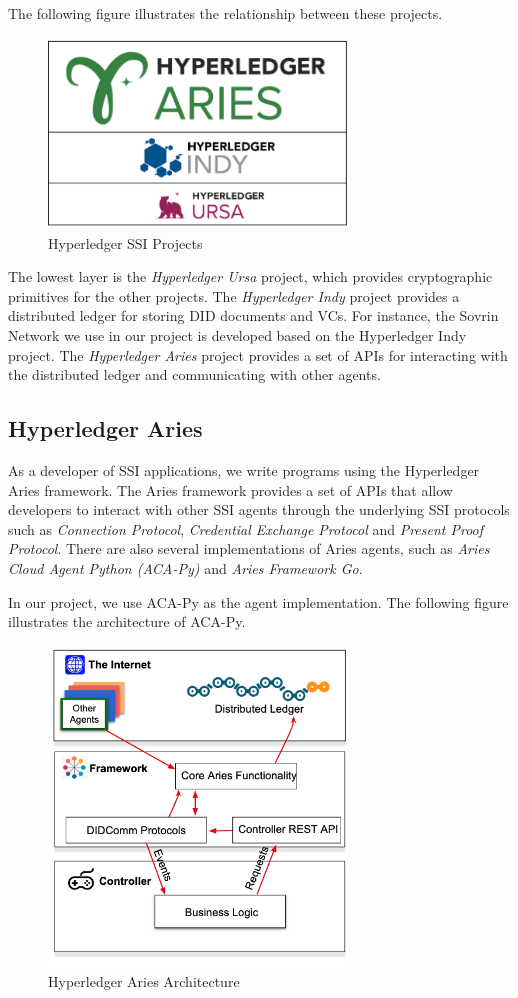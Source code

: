 \documentclass[
]{report}
\begin{document}
The following figure illustrates the relationship between these projects.

\begin{figure}
\centering
\includegraphics[width=8cm]{eco.png}
\caption{Hyperledger SSI Projects}
\end{figure}

The lowest layer is the \emph{Hyperledger Ursa} project, which provides
cryptographic primitives for the other projects. The \emph{Hyperledger
Indy} project provides a distributed ledger for storing DID documents and
VCs. For instance, the Sovrin Network we use in our project is developed
based on the Hyperledger Indy project. The \emph{Hyperledger Aries}
project provides a set of APIs for interacting with the distributed
ledger and communicating with other agents.

\subsection{Hyperledger Aries}
As a developer of SSI applications, we write programs using the Hyperledger
Aries framework. The Aries framework provides a set of APIs that allow
developers to interact with other SSI agents through the underlying SSI
protocols such as \emph{Connection Protocol}, \emph{Credential Exchange
Protocol} and \emph{Present Proof Protocol}. There are also several
implementations of Aries agents, such as \emph{Aries Cloud Agent
Python (ACA-Py)} and \emph{Aries Framework Go}.

In our project, we use ACA-Py as the agent implementation. The following
figure illustrates the architecture of ACA-Py.

\begin{figure}
\centering
\includegraphics[width=8cm]{aca-py.png}
\caption{Hyperledger Aries Architecture}
\end{figure}
\end{document}

